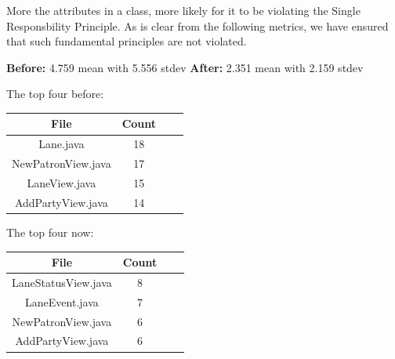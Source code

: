 More the attributes in a class, more likely for it to be violating the Single Responsbility Principle. As is clear from the following metrics, we have ensured that such fundamental principles are not violated.


\textbf{Before:} 4.759 mean with 5.556 stdev
\textbf{After:} 2.351 mean with 2.159 stdev

The top four before:

\begin{tabular}{ |c|c|c|c| }
    \hline
    \textbf{File}       & \textbf{Count} \\
    \hline
    Lane.java           & 18 \\
    NewPatronView.java  & 17 \\
    LaneView.java       & 15 \\
    AddPartyView.java   & 14 \\
    \hline
\end{tabular}

The top four now:

\begin{tabular}{ |c|c|c|c| }
    \hline
    \textbf{File}       & \textbf{Count} \\
    \hline
    LaneStatusView.java & 8                          \\
    LaneEvent.java           & 7                    \\
    NewPatronView.java       & 6                        \\
    AddPartyView.java   & 6                         \\
    \hline
\end{tabular}
